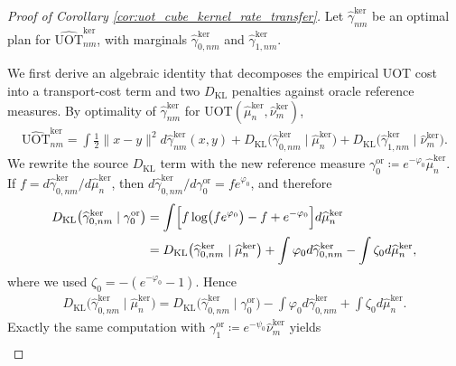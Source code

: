 \documentclass[11pt,reqno]{amsart}
\theoremstyle{definition}
\newcommand{\KL}{\mathrm{KL}}
\renewcommand{\hat}{\widehat}
\begin{document}
\begin{proof}[Proof of Corollary \ref{cor:uot_cube_kernel_rate_transfer}]
Let $\hat\gamma_{nm}^{\mathrm{ker}}$ be an optimal plan for
$\widehat{\mathrm{UOT}}_{nm}^{\mathrm{ker}}$, with marginals
$\hat\gamma_{0,nm}^{\mathrm{ker}}$ and $\hat\gamma_{1,nm}^{\mathrm{ker}}$.

We first derive an algebraic identity that decomposes the empirical UOT cost into a transport-cost term and two $D_\KL$ penalties against oracle reference measures. By optimality of $\hat\gamma_{nm}^{\mathrm{ker}}$ for $\mathrm{UOT}(\hat\mu_n^{\mathrm{ker}},\hat\nu_m^{\mathrm{ker}})$,
\begin{align}
\label{eq:uot_cube_kernel_exact_excess_start}
    \widehat{\mathrm{UOT}}_{nm}^{\mathrm{ker}}
    =
    \int \tfrac{1}{2}\|x-y\|^2 d\hat\gamma_{nm}^{\mathrm{ker}}(x,y)
    + {D_\KL}\bigl(\hat\gamma_{0,nm}^{\mathrm{ker}}\mid \hat\mu_n^{\mathrm{ker}}\bigr)
    + {D_\KL}\bigl(\hat\gamma_{1,nm}^{\mathrm{ker}}\mid \hat\nu_m^{\mathrm{ker}}\bigr).
\end{align}
We rewrite the source $D_\KL$ term with the new reference measure $\gamma_0^{\mathrm{or}}\coloneqq e^{-\varphi_0}\hat\mu_n^{\mathrm{ker}}$. If $f=d\hat\gamma_{0,nm}^{\mathrm{ker}}/d\hat\mu_n^{\mathrm{ker}}$, then $d\hat\gamma_{0,nm}^{\mathrm{ker}}/d\gamma_0^{\mathrm{or}} = fe^{\varphi_0}$, and therefore
\begin{align*}
    {D_\KL}\bigl(\hat\gamma_{0,nm}^{\mathrm{ker}}\mid \gamma_0^{\mathrm{or}}\bigr)
    &= \int\Bigl[f\log\bigl(fe^{\varphi_0}\bigr)-f+e^{-\varphi_0}\Bigr]d\hat\mu_n^{\mathrm{ker}} \\
    &= {D_\KL}\bigl(\hat\gamma_{0,nm}^{\mathrm{ker}}\mid \hat\mu_n^{\mathrm{ker}}\bigr)
    + \int \varphi_0 d\hat\gamma_{0,nm}^{\mathrm{ker}}
    - \int \zeta_0 d\hat\mu_n^{\mathrm{ker}},
\end{align*}
where we used $\zeta_0=-(e^{-\varphi_0}-1)$. Hence
\begin{align}
\label{eq:uot_cube_kernel_exact_excess_source}
    {D_\KL}\bigl(\hat\gamma_{0,nm}^{\mathrm{ker}}\mid \hat\mu_n^{\mathrm{ker}}\bigr)
    =
    {D_\KL}\bigl(\hat\gamma_{0,nm}^{\mathrm{ker}}\mid \gamma_0^{\mathrm{or}}\bigr)
    - \int \varphi_0 d\hat\gamma_{0,nm}^{\mathrm{ker}}
    + \int \zeta_0 d\hat\mu_n^{\mathrm{ker}}.
\end{align}
Exactly the same computation with $\gamma_1^{\mathrm{or}}\coloneqq e^{-\psi_0}\hat\nu_m^{\mathrm{ker}}$ yields
\begin{align}
\label{eq:uot_cube_kernel_exact_excess_target}

\end{align}
\end{proof}
\end{document}

